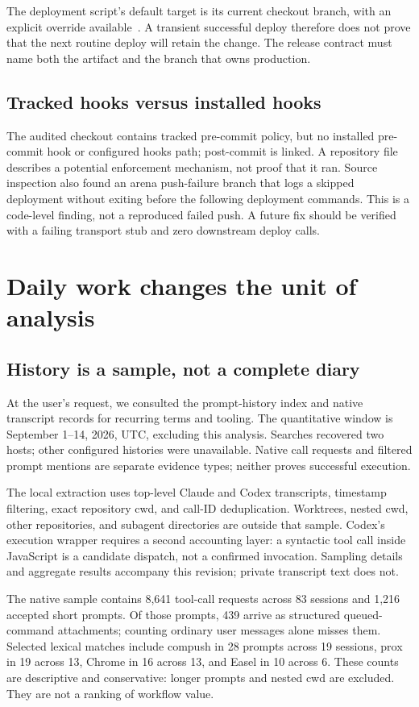 \documentclass[10pt,letterpaper,twocolumn]{article}
\begin{document}
The deployment script's default target is its current checkout branch, with an explicit override available~\cite{release}. A transient successful deploy therefore does not prove that the next routine deploy will retain the change. The release contract must name both the artifact and the branch that owns production.

\subsection{Tracked hooks versus installed hooks}
The audited checkout contains tracked pre-commit policy, but no installed pre-commit hook or configured hooks path; post-commit is linked. A repository file describes a potential enforcement mechanism, not proof that it ran. Source inspection also found an arena push-failure branch that logs a skipped deployment without exiting before the following deployment commands. This is a code-level finding, not a reproduced failed push. A future fix should be verified with a failing transport stub and zero downstream deploy calls.


\section{Daily work changes the unit of analysis}
\subsection{History is a sample, not a complete diary}
At the user's request, we consulted the prompt-history index and native transcript records for recurring terms and tooling. The quantitative window is September 1--14, 2026, UTC, excluding this analysis. Searches recovered two hosts; other configured histories were unavailable. Native call requests and filtered prompt mentions are separate evidence types; neither proves successful execution.

The local extraction uses top-level Claude and Codex transcripts, timestamp filtering, exact repository cwd, and call-ID deduplication. Worktrees, nested cwd, other repositories, and subagent directories are outside that sample. Codex's execution wrapper requires a second accounting layer: a syntactic tool call inside JavaScript is a candidate dispatch, not a confirmed invocation. Sampling details and aggregate results accompany this revision; private transcript text does not.


The native sample contains 8,641 tool-call requests across 83 sessions and 1,216 accepted short prompts. Of those prompts, 439 arrive as structured queued-command attachments; counting ordinary user messages alone misses them. Selected lexical matches include compush in 28 prompts across 19 sessions, prox in 19 across 13, Chrome in 16 across 13, and Easel in 10 across 6. These counts are descriptive and conservative: longer prompts and nested cwd are excluded. They are not a ranking of workflow value.
\end{document}
